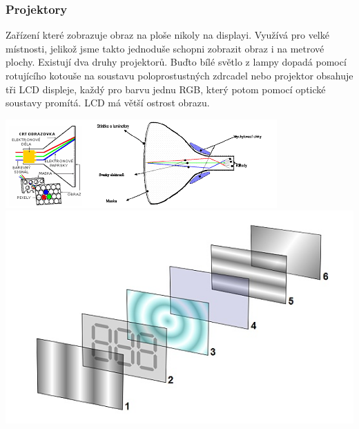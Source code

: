 \subsubsection{Projektory}
Zařízení které zobrazuje obraz na ploše nikoly na displayi.
Využívá pro velké místnosti, jelikož jsme takto jednoduše schopni zobrazit obraz i na metrové plochy.
Existují dva druhy projektorů.
Buďto bílé světlo z lampy dopadá pomocí rotujícího kotouše na soustavu poloprostustných zdrcadel nebo projektor obsahuje tři LCD displeje, každý pro barvu jednu RGB, který potom pomocí optické soustavy promítá.
LCD má větší ostrost obrazu.\\
\begin{multicols}{2}
  \includegraphics[width=\linewidth]{TVY-POS/Vystupni-zobrazovaci-zarizeni/crt.png}
  \columnbreak
  \includegraphics[width=\linewidth]{TVY-POS/Vystupni-zobrazovaci-zarizeni/lcd.png}
\end{multicols}
